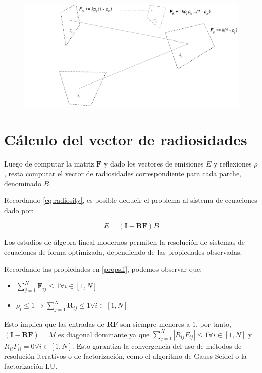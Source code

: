 \vspace{5mm}
\begin{figure}[H]
	\includegraphics[width=1\linewidth]{assets/extended}
	\label{img:caminoespecular}
\end{figure}

\section{Cálculo del vector de radiosidades}

Luego de computar la matriz $\mathbf{F}$ y dado los vectores de emisiones $E$ y reflexiones $\rho$, resta computar el vector de radiosidades correspondiente para cada parche, denominado $B$.

Recordando \eqref{eq:radiosity}, es posible deducir el problema al sistema de ecuaciones dado por:

\begin{equation}
	E = (\mathbf{I} - \mathbf{RF})B
\end{equation}

Los estudios de álgebra lineal modernos permiten la resolución de sistemas de ecuaciones de forma optimizada, dependiendo de las propiedades observadas.

Recordando las propiedades en \ref{propsff}, podemos observar que:

\begin{itemize}
	\item $\sum_{j=1}^{N} \mathbf{F}_{ij} \leq 1 \forall{i \in [1,N]}$
	\item $\rho_{i} \leq 1 \rightarrow \sum_{j=1}^{N} \mathbf{R}_{ij} \leq 1 \forall{i \in [1,N]}$
\end{itemize}

Esto implica que las entradas de $\mathbf{RF}$ s\texttt{}on siempre menores a $1$, por tanto, $(\mathbf{I} - \mathbf{RF}) = M$ es diagonal dominante ya que $\sum_{j=1}^{N}|R_{ij}F_{ij}| \le 1 \forall i \in [1, N]$ y $R_{ii}F_{ii} = 0  \forall  i \in [1,N]$. Esto garantiza la convergencia del uso de métodos de resolución iterativos o de factorización, como el algoritmo de Gauss-Seidel o la factorización LU.

